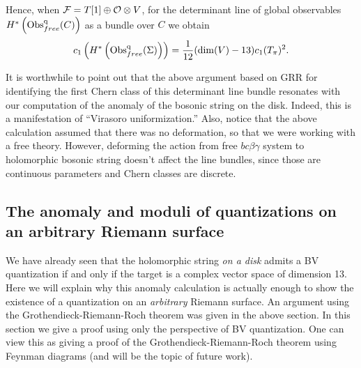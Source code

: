 Hence, when $\mathcal F = T[1] \oplus \mathcal O \otimes V$, for the determinant line of global observables $H^*\left({\rm Obs}^{\rm q}_{free}(C)\right)$ as a bundle over $C$ we obtain
\[
c_1\left(H^*\left({\rm Obs}^{\rm q}_{free}(\Sigma)\right)\right) = \frac{1}{12} (\dim(V) - 13) c_1(T_\pi)^2 .
\]


It is worthwhile to point out that the above argument based on GRR for identifying the first Chern class of this determinant line bundle resonates with our computation of the anomaly of the bosonic string on the disk. Indeed, this is a manifestation of ``Virasoro uniformization.'' 
Also, notice that the above calculation assumed that there was no deformation, so that we were working with a free theory. 
However, deforming the action from free $bc\beta\gamma$ system to holomorphic bosonic string doesn't affect the line bundles, since those are continuous parameters and Chern classes are discrete.

\subsection{The anomaly and moduli of quantizations on an arbitrary Riemann surface}

We have already seen that the holomorphic string {\it on a disk} admits a BV quantization if and only if the target is a complex vector space of dimension 13.
Here we will explain why this anomaly calculation is actually enough to show the existence of a quantization on an {\it arbitrary} Riemann surface. 
An argument using the Grothendieck-Riemann-Roch theorem was given in the above section. 
In this section we give a proof using only the perspective of BV quantization.
One can view this as giving a proof of the Grothendieck-Riemann-Roch theorem using Feynman diagrams (and will be the topic of future work). 

